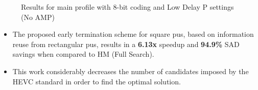 \documentclass[10pt, sans, mathserif]{beamer}
\begin{document}
\begin{frame}[t]
\begin{columns}[t, onlytextwidth]
\begin{column}{0.5\textwidth}
        \begin{block}{}
            
            \begin{figure}[htb]
                \centering
                
                \vspace{-0.5em}
                \caption{Results for main profile with 8-bit coding and Low Delay P settings (No AMP)}
                \label{fig:SADSavingBar}
            \end{figure}
        \end{block}

        \begin{block}{}
        \begin{itemize}
            \item The proposed early termination scheme for square \glspl{pu}, based on information reuse from rectangular \glspl{pu}, results in a \textbf{6.13x} speedup and \textbf{94.9\%} SAD savings when compared to HM (Full Search).
            \item This work considerably decreases the number of candidates imposed by the HEVC standard in order to find the optimal solution.
        \end{itemize}
        \end{block}

    \end{column}
\end{columns}
\end{frame}
\end{document}
